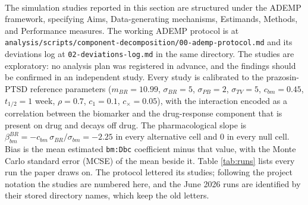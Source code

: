 \documentclass[
  11pt,
]{article}
\begin{document}
The simulation studies reported in this section are structured under the\textsuperscript{} ADEMP framework, specifying Aims, Data-generating
mechanisms, Estimands, Methods, and Performance measures. The working
ADEMP protocol is at
\texttt{analysis/scripts/component-decomposition/00-ademp-protocol.md}
and its deviations log at \texttt{02-deviations-log.md} in the same
directory. The studies are exploratory: no analysis plan was registered
in advance, and the findings should be confirmed in an independent study.
Every study is calibrated to the prazosin-PTSD reference parameters
(\(m_{BR} = 10.99\), \(\sigma_{BR} = 5\), \(\sigma_{PB} = 2\), \(\sigma_{TV} =
5\), \(c_{bm} = 0.45\), \(t_{1/2} = 1\) week, \(\rho = 0.7\), \(c_1 = 0.1\),
\(c_\times = 0.05\)), with the interaction encoded as a correlation between
the biomarker and the drug-response component that is present on drug and
decays off drug. The pharmacological slope is \(\beta_{bm}^{BR} =
-c_{bm}\,\sigma_{BR}/\sigma_{bm} = -2.25\) in every alternative cell and
\(0\) in every null cell. Bias is the mean estimated \texttt{bm:Dbc}
coefficient minus that value, with the Monte Carlo standard error (MCSE)
of the mean beside it. Table \ref{tab:runs} lists every run the paper
draws on. The protocol lettered its studies; following the project
notation the studies are numbered here, and the June 2026 runs are
identified by their stored directory names, which keep the old letters.

\begin{table}[H]
\centering
\caption{\label{tab:runs}Simulation runs reported in this paper. Replicates are given as alternative / null where the two differ. Directories are under analysis/data/derived\_data/component-decomposition/ unless stated. Seeds enter as set.seed(seed + 1000 cell + replicate). The corrected study ran on the simulation host as job 49 at commit 05205dd; its 28 cells took 4.3 hours of elapsed time on 11 worker processes, about 47 core-hours.}
\centering
{}
\end{table}
\end{document}
